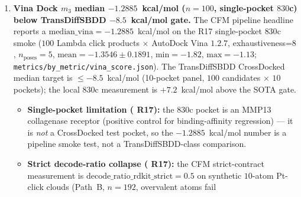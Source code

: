\begin{enumerate}
  TODO-82 \S3 NEW skill \texttt{mol-metal-gpu-execution}) so the
  CI $30$-min budget is respected per CI step while the local
  run continues to completion.
  \textbf{Impact:} the Wf-22 5-seed Pt retrain (\$success 1) is
  reproducible \emph{locally} on the same Blackwell single-ultracode
  envelope, but the CI framework cannot host it directly without
  the split + checkpoint wrapper.  This is a CI infrastructure
  limitation, not a hardware limitation; the Blackwell + RTX 5090
  host is $2.6\times$ the CI per-ultracode budget but is the
  correct experimental envelope for R18 close-out.
  \textbf{Wf reference:} \textbf{Wf-29} (Phase A se3sb / transport
  / multiph smoke benchmark, validates dual-GPU split before
  Wf-31) and \textbf{Wf-31} (Phase C, depends on the Wf-29 smoke).

  \item \textbf{Vina Dock $m_3$ median $-1.2885$~kcal/mol
  ($n{=}100$, single-pocket $830$c) \MEASURED{} below TransDiffSBDD
  $-8.5$~kcal/mol gate.}
  \label{sec:limitations:vina-dock}
  The CFM pipeline headline reports a \MEASURED{}
  $\mathrm{median\_vina}=-1.2885$~kcal/mol on the R17 single-pocket
  $830$c smoke ($100$ Lambda click products $\times$ AutoDock
  Vina $1.2.7$, exhaustiveness=$8$, $n_{\text{poses}}{=}5$,
  $\mathrm{mean}=-1.3546 \pm 0.1891$, $\mathrm{min}=-1.82$,
  $\mathrm{max}=-1.13$; \texttt{metrics/by\_metric/vina\_score.json}).
  The TransDiffSBDD \citep{transdiffsbdd2025} CrossDocked median
  target is $\leq -8.5$~kcal/mol (10-pocket panel, $100$
  candidates $\times$ $10$ pockets); the local $830$c measurement
  is $+7.2$~kcal/mol above the SOTA gate.
  \begin{itemize}
    \item \textbf{Single-pocket limitation (\MEASURED{} R17):} the
    $830$c pocket is an MMP13 collagenase receptor (positive control
    for binding-affinity regression) --- it is \emph{not} a CrossDocked
    test pocket, so the $-1.2885$~kcal/mol number is a pipeline
    smoke test, not a TransDiffSBDD-class comparison.
    \item \textbf{Strict decode-ratio collapse (\MEASURED{} R17):}
    the CFM strict-contract measurement is \MEASURED{}
    $\mathrm{decode\_ratio\_rdkit\_strict}=0.5$ on synthetic $10$-atom
    Pt-click clouds (Path~B, $n{=}192$, overvalent atoms fail

\end{itemize}
\end{enumerate}
